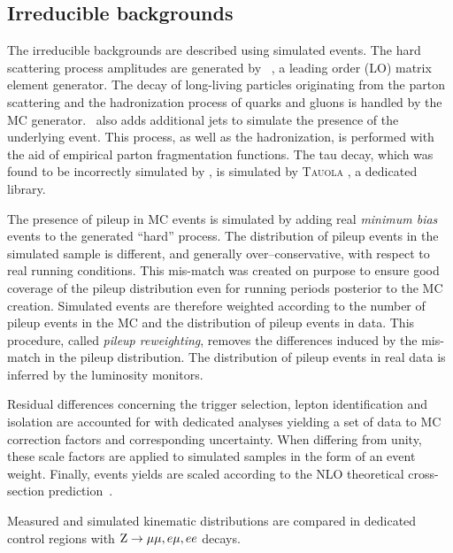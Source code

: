 \subsection{Irreducible backgrounds}

The irreducible backgrounds are described using simulated events. The hard scattering process amplitudes are generated by \madgraph\ \cite{MG4}, a leading order (LO) matrix element generator. The decay of long-living particles originating from the parton scattering and the hadronization process of quarks and gluons is handled by the \pythia\ \cite{pythia} MC generator. \pythia\ also adds additional jets to simulate the presence of the underlying event. This process, as well as the hadronization, is performed with the aid of empirical parton fragmentation functions. The tau decay, which was found to be incorrectly simulated by \pythia, is simulated by \textsc{Tauola} \cite{tauola}, a dedicated library. 

The presence of pileup in MC events is simulated by adding real \emph{minimum bias} events to the generated ``hard'' process. The distribution of pileup events in the simulated sample is different, and generally over--conservative, with respect to real running conditions. 
This mis-match was created on purpose to ensure good coverage of the pileup distribution even for running periods posterior to the MC creation.
Simulated events are therefore weighted according to the number of pileup events in the MC and the distribution of pileup events in data. This procedure, called \emph{pileup reweighting}, removes the differences induced by the mis-match in the pileup distribution. The distribution of pileup events in real data is inferred by the luminosity monitors.

Residual differences concerning the trigger selection, lepton identification and isolation are accounted for with dedicated analyses yielding a set of data to MC correction factors and corresponding uncertainty. When differing from unity, these scale factors are applied to simulated samples in the form of an event weight.
Finally, events yields are scaled according to the NLO theoretical cross-section prediction~\cite{MCFM}. 

Measured and simulated kinematic distributions are compared in dedicated control regions with $\mathrm{Z}\rightarrow\mu\mu,e\mu,ee$ decays. %

